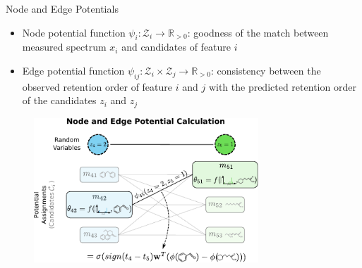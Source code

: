 \documentclass{beamer}
\begin{document}
\begin{frame}{}
\begin{columns}[T]
    \begin{block}{Node and Edge Potentials}
    \begin{itemize}
        \item Node potential function $\psi_i:\mathcal{Z}_i\rightarrow\mathbb{R}_{>0}$: goodness of the match between measured spectrum $x_i$ and candidates of feature $i$
        \item Edge potential function $\psi_{ij}:\mathcal{Z}_i\times\mathcal{Z}_j\rightarrow\mathbb{R}_{>0}$: consistency between the observed retention order of feature $i$ and $j$ with the predicted retention order of the candidates $z_i$ and $z_j$
    \end{itemize}
    \begin{figure}
        \centering
        \includegraphics[width=0.75\textwidth]{images/node_and_edge_scores.pdf}
    \end{figure}
    \end{block}


\hfill
{}


\end{columns}
\end{frame}
\end{document}
